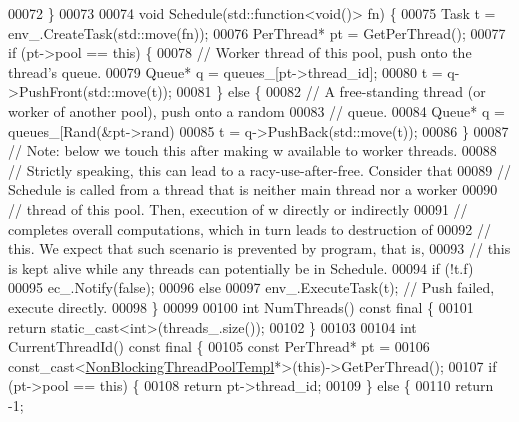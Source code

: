 \begin{DoxyCode}
{00072   \}
00073 
00074   \textcolor{keywordtype}{void} Schedule(std::function<\textcolor{keywordtype}{void}()> fn) \{
00075     Task t = env\_.CreateTask(std::move(fn));
00076     PerThread* pt = GetPerThread();
00077     \textcolor{keywordflow}{if} (pt->pool == \textcolor{keyword}{this}) \{
00078       \textcolor{comment}{// Worker thread of this pool, push onto the thread's queue.}
00079       Queue* q = queues\_[pt->thread\_id];
00080       t = q->PushFront(std::move(t));
00081     \} \textcolor{keywordflow}{else} \{
00082       \textcolor{comment}{// A free-standing thread (or worker of another pool), push onto a random}
00083       \textcolor{comment}{// queue.}
00084       Queue* q = queues\_[Rand(&pt->rand) %
00085       t = q->PushBack(std::move(t));
00086     \}
00087     \textcolor{comment}{// Note: below we touch this after making w available to worker threads.}
00088     \textcolor{comment}{// Strictly speaking, this can lead to a racy-use-after-free. Consider that}
00089     \textcolor{comment}{// Schedule is called from a thread that is neither main thread nor a worker}
00090     \textcolor{comment}{// thread of this pool. Then, execution of w directly or indirectly}
00091     \textcolor{comment}{// completes overall computations, which in turn leads to destruction of}
00092     \textcolor{comment}{// this. We expect that such scenario is prevented by program, that is,}
00093     \textcolor{comment}{// this is kept alive while any threads can potentially be in Schedule.}
00094     \textcolor{keywordflow}{if} (!t.f)
00095       ec\_.Notify(\textcolor{keyword}{false});
00096     \textcolor{keywordflow}{else}
00097       env\_.ExecuteTask(t);  \textcolor{comment}{// Push failed, execute directly.}
00098   \}
00099 
00100   \textcolor{keywordtype}{int} NumThreads() \textcolor{keyword}{const} \textcolor{keyword}{final} \{
00101     \textcolor{keywordflow}{return} \textcolor{keyword}{static\_cast<}\textcolor{keywordtype}{int}\textcolor{keyword}{>}(threads\_.size());
00102   \}
00103 
00104   \textcolor{keywordtype}{int} CurrentThreadId() \textcolor{keyword}{const} \textcolor{keyword}{final} \{
00105     \textcolor{keyword}{const} PerThread* pt =
00106         \textcolor{keyword}{const\_cast<}\hyperlink{class_eigen_1_1_non_blocking_thread_pool_templ}{NonBlockingThreadPoolTempl}*\textcolor{keyword}{>}(\textcolor{keyword}{this})->GetPerThread();
00107     \textcolor{keywordflow}{if} (pt->pool == \textcolor{keyword}{this}) \{
00108       \textcolor{keywordflow}{return} pt->thread\_id;
00109     \} \textcolor{keywordflow}{else} \{
00110       \textcolor{keywordflow}{return} -1;
}
\end{DoxyCode}
